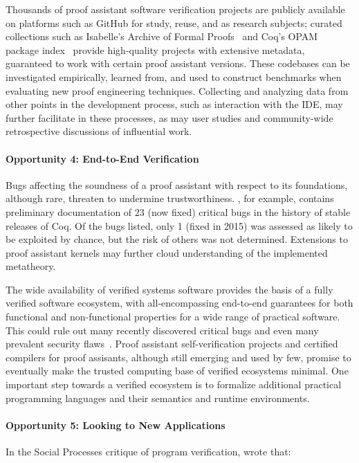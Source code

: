Thousands of proof assistant software verification projects are publicly available on platforms such as GitHub for study, reuse, and as research subjects; curated collections such as Isabelle's Archive of Formal Proofs~\citep{isabelleafp} and Coq's OPAM package index~\citep{CoqOPAM} provide high-quality projects with extensive metadata, guaranteed to work with certain proof assistant versions. These codebases can be investigated empirically, learned from, 
and used to construct benchmarks when evaluating new proof engineering techniques. Collecting and analyzing data from other points in the development
process, such as interaction with the IDE, may further facilitate in these processes, as may user studies and community-wide retrospective discussions
of influential work.

\paragraph{Opportunity 4: End-to-End Verification}
Bugs affecting the soundness of a proof assistant with respect to its foundations, although rare, threaten to undermine trustworthiness.
\cite{coq-critical}, for example, contains preliminary documentation of 23 (now fixed) critical bugs in the history of stable releases of Coq. Of the bugs listed,
only 1 (fixed in 2015) was assessed as likely to be exploited by chance, but the risk of others was not determined.
Extensions to proof assistant kernels may further cloud understanding of the implemented metatheory. 

The wide availability of verified systems software provides the basis of a fully verified software ecosystem, with all-encompassing end-to-end guarantees for both functional and non-functional properties for a wide range of practical software. This could rule out many recently discovered critical bugs and even many prevalent security flaws~\citep{Chlipala2018}. Proof assistant self-verification projects and certified compilers for proof assisants, although still emerging and used by few, promise to eventually make the trusted computing base of verified ecosystems minimal. One important step towards a verified ecosystem is to formalize additional practical programming languages and their semantics and runtime environments.

\paragraph{Opportunity 5: Looking to New Applications}
In the Social Processes critique of program verification, \cite{DeMillo1977} wrote that:

